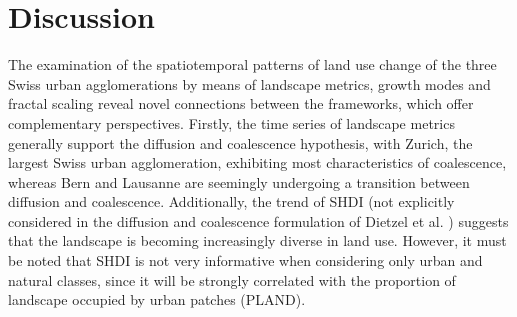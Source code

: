 \documentclass[10pt,letterpaper]{article}
\begin{document}

\section*{Discussion}

The examination of the spatiotemporal patterns of land use change of the three Swiss urban agglomerations by means of landscape metrics, growth modes and fractal scaling reveal novel connections between the frameworks, which offer complementary perspectives.
Firstly, the time series of landscape metrics generally support the diffusion and coalescence hypothesis, with Zurich, the largest Swiss urban agglomeration, exhibiting most characteristics of coalescence, whereas Bern and Lausanne are seemingly undergoing a transition between diffusion and coalescence. Additionally, the trend of SHDI (not explicitly considered in the diffusion and coalescence formulation of Dietzel et al. \cite{dietzel2005spatio}) suggests that the landscape is becoming increasingly diverse in land use. %
However, it must be noted that SHDI is not very informative when considering only urban and natural classes, since it will be strongly correlated with the proportion of landscape occupied by urban patches (PLAND).
\end{document}
